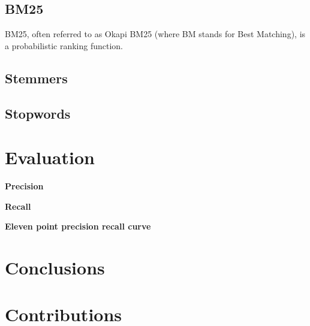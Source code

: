 \subsection{BM25}

BM25, often referred to as Okapi BM25 (where BM stands for Best Matching), is a probabilistic ranking function. 

\subsection{Stemmers}
\subsection{Stopwords}


\section{Evaluation}


\textbf{Precision}

\textbf{Recall}

\textbf{Eleven point precision recall curve}


\section{Conclusions}


\section{Contributions}


